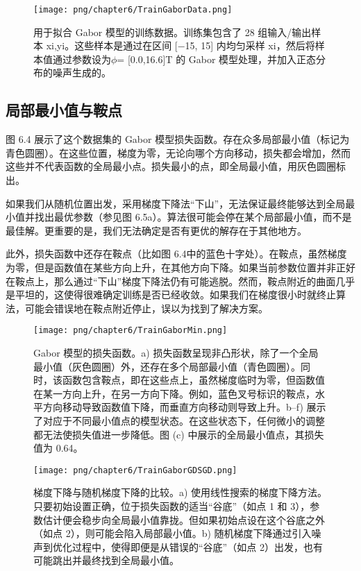 \begin{figure}[ht!]
\centering
\texttt{[image: png/chapter6/TrainGaborData.png]}
\caption{用于拟合 Gabor 模型的训练数据。训练集包含了 28 组输入/输出样本 {xi,yi}。这些样本是通过在区间 [−15, 15] 内均匀采样 xi，然后将样本值通过参数设为\(\phi\)= [0.0,16.6]T 的 Gabor 模型处理，并加入正态分布的噪声生成的。}
\end{figure}

\subsection{局部最小值与鞍点}
图 6.4 展示了这个数据集的 Gabor 模型损失函数。存在众多局部最小值（标记为青色圆圈）。在这些位置，梯度为零，无论向哪个方向移动，损失都会增加，然而这些并不代表函数的全局最小点。损失最小的点，即全局最小值，用灰色圆圈标出。

如果我们从随机位置出发，采用梯度下降法“下山”，无法保证最终能够达到全局最小值并找出最优参数（参见图 6.5a）。算法很可能会停在某个局部最小值，而不是最佳解。更重要的是，我们无法确定是否有更优的解存在于其他地方。

此外，损失函数中还存在鞍点（比如图 6.4中的蓝色十字处）。在鞍点，虽然梯度为零，但是函数值在某些方向上升，在其他方向下降。如果当前参数位置并非正好在鞍点上，那么通过“下山”梯度下降法仍有可能逃脱。然而，鞍点附近的曲面几乎是平坦的，这使得很难确定训练是否已经收敛。如果我们在梯度很小时就终止算法，可能会错误地在鞍点附近停止，误以为找到了解决方案。


\begin{figure}[ht!]
\centering
\texttt{[image: png/chapter6/TrainGaborMin.png]}
\caption{Gabor 模型的损失函数。a) 损失函数呈现非凸形状，除了一个全局最小值（灰色圆圈）外，还存在多个局部最小值（青色圆圈）。同时，该函数包含鞍点，即在这些点上，虽然梯度临时为零，但函数值在某一方向上升，在另一方向下降。例如，蓝色叉号标识的鞍点，水平方向移动导致函数值下降，而垂直方向移动则导致上升。b–f) 展示了对应于不同最小值点的模型状态。在这些状态下，任何微小的调整都无法使损失值进一步降低。图 (c) 中展示的全局最小值点，其损失值为 0.64。}
\end{figure}

\begin{figure}[ht!]
\centering
\texttt{[image: png/chapter6/TrainGaborGDSGD.png]}
\caption{梯度下降与随机梯度下降的比较。a) 使用线性搜索的梯度下降方法。只要初始设置正确，位于损失函数的适当“谷底”（如点 1 和 3），参数估计便会稳步向全局最小值靠拢。但如果初始点设在这个谷底之外（如点 2），则可能会陷入局部最小值。b) 随机梯度下降通过引入噪声到优化过程中，使得即便是从错误的“谷底”（如点 2）出发，也有可能跳出并最终找到全局最小值。}
\end{figure}

